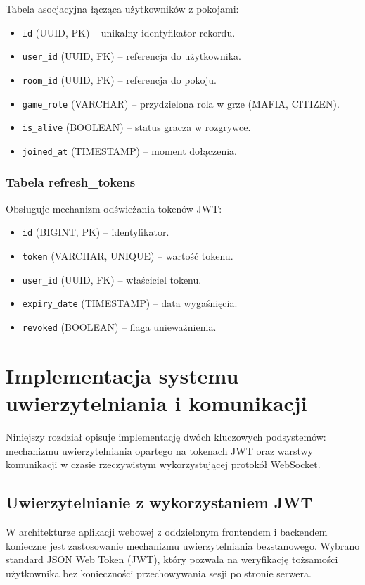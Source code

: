 ﻿\documentclass[a4paper,twoside,11pt]{mwrep}
\theoremstyle{plain} \newtheorem{thm}{Twierdzenie}
\theoremstyle{plain} \newtheorem{lem}{Lemat}
\theoremstyle{definition} \newtheorem{defn}{Definicja}
\theoremstyle{remark} \newtheorem*{rem}{Wniosek}
\begin{document}
Tabela asocjacyjna łącząca użytkowników z pokojami:
\begin{itemize}
    \item \texttt{id} (UUID, PK) -- unikalny identyfikator rekordu.
    \item \texttt{user\_id} (UUID, FK) -- referencja do użytkownika.
    \item \texttt{room\_id} (UUID, FK) -- referencja do pokoju.
    \item \texttt{game\_role} (VARCHAR) -- przydzielona rola w grze (MAFIA, CITIZEN).
    \item \texttt{is\_alive} (BOOLEAN) -- status gracza w rozgrywce.
    \item \texttt{joined\_at} (TIMESTAMP) -- moment dołączenia.
\end{itemize}

\subsection{Tabela refresh\_tokens}

Obsługuje mechanizm odświeżania tokenów JWT:
\begin{itemize}
    \item \texttt{id} (BIGINT, PK) -- identyfikator.
    \item \texttt{token} (VARCHAR, UNIQUE) -- wartość tokenu.
    \item \texttt{user\_id} (UUID, FK) -- właściciel tokenu.
    \item \texttt{expiry\_date} (TIMESTAMP) -- data wygaśnięcia.
    \item \texttt{revoked} (BOOLEAN) -- flaga unieważnienia.
\end{itemize}
\chapter{Implementacja systemu uwierzytelniania i komunikacji}
\label{chap:implementacja_auth}

Niniejszy rozdział opisuje implementację dwóch kluczowych podsystemów: mechanizmu uwierzytelniania opartego na tokenach JWT oraz warstwy komunikacji w czasie rzeczywistym wykorzystującej protokół WebSocket.

\section{Uwierzytelnianie z wykorzystaniem JWT}

W architekturze aplikacji webowej z oddzielonym frontendem i backendem konieczne jest zastosowanie mechanizmu uwierzytelniania bezstanowego. Wybrano standard JSON Web Token (JWT), który pozwala na weryfikację tożsamości użytkownika bez konieczności przechowywania sesji po stronie serwera.
\end{document}
